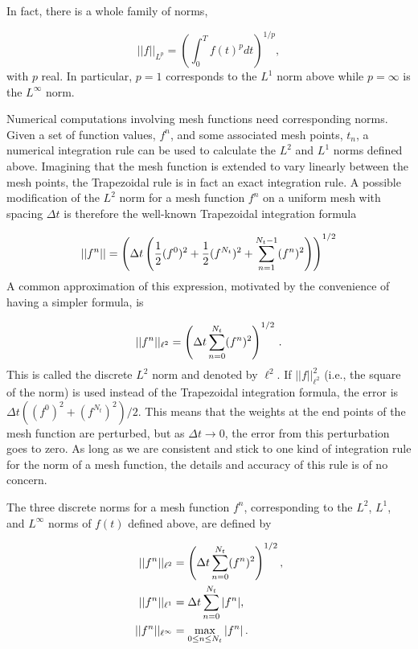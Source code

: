 \documentclass[%
oneside,                 %
final,                   %
10pt]{article}
\begin{document}
In fact, there is a whole family of norms,

\begin{equation}
||f||_{L^p} = \left(\int_0^T f(t)^pdt\right)^{1/p},
\end{equation}
with $p$ real. In particular,
$p=1$ corresponds to the $L^1$ norm above while $p=\infty$ is the
$L^\infty$ norm.


Numerical computations involving mesh functions need corresponding norms.
Given a set of function values, $f^n$, and some associated mesh points, $t_n$,
a numerical integration rule can be used to calculate the $L^2$ and
$L^1$ norms defined above. Imagining that the mesh function is extended
to vary linearly between the mesh points, the Trapezoidal rule is
in fact an exact integration rule. A possible modification of the $L^2$
norm for a mesh function $f^n$ on a uniform mesh with spacing $\Delta t$
is therefore the well-known Trapezoidal integration formula

\[ ||f^n|| = \left(\Delta t\left(\frac{1}{2}(f^0)^2 + \frac{1}{2}(f^{N_t})^2
+ \sum_{n=1}^{N_t-1} (f^n)^2\right)\right)^{1/2} \]
A common approximation of this expression, motivated by the
convenience of having a simpler formula, is

\[ ||f^n||_{\ell^2} = \left(\Delta t\sum_{n=0}^{N_t} (f^n)^2\right)^{1/2} \thinspace .\]
This is called the discrete $L^2$ norm and denoted by $\ell^2$.
If $||f||_{\ell^2}^2$ (i.e., the square of the norm) is used
instead of the Trapezoidal integration formula,
the error
is $\Delta t((f^0)^2 + (f^{N_t})^2)/2$. This means that the
weights at the end points of the mesh function are perturbed,
but as $\Delta t\rightarrow 0$, the error from this perturbation goes
to zero. As long as we are consistent and
stick to one kind of integration
rule for the norm of a mesh function, the details and accuracy of this
rule is of no concern.

The three discrete norms for a mesh function $f^n$, corresponding to
the $L^2$, $L^1$, and $L^\infty$ norms of $f(t)$ defined above, are
defined by

\begin{align}
||f^n||_{\ell^2} &= \left( \Delta t\sum_{n=0}^{N_t} (f^n)^2\right)^{1/2},
\label{decay:norms:l2}\\ 
||f^n||_{\ell^1} &= \Delta t\sum_{n=0}^{N_t} |f^n|,
\label{decay:norms:l1}\\ 
||f^n||_{\ell^\infty} &= \max_{0\leq n\leq N_t}|f^n|\thinspace .
\label{decay:norms:linf}
\end{align}
\end{document}
